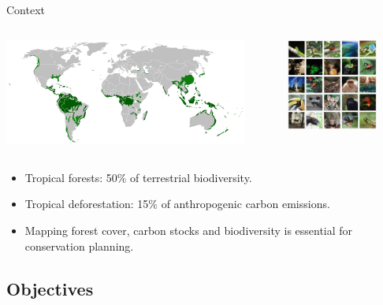 \documentclass[10pt,table,dvipsnames,compress]{beamer}
\begin{document}
\begin{frame}[label={sec:org7dbb06c}]{Context}
\begin{columns}
\begin{column}{0.7\columnwidth}
\begin{center}
\includegraphics[width=8cm]{figs/rain_forests_map.png}
\end{center}
\end{column}

\begin{column}{0.3\columnwidth}
\begin{center}
\includegraphics[width=3cm]{figs/tropical_forest_biodiv.png}
\end{center}
\end{column}
\end{columns}


\begin{block}{}
\begin{itemize}
\item Tropical forests: 50\% of terrestrial biodiversity.
\item Tropical deforestation: 15\% of anthropogenic carbon emissions.
\item Mapping forest cover, carbon stocks and biodiversity is essential for conservation planning.
\end{itemize}
\end{block}
\end{frame}

\subsection{Objectives}
\label{sec:org2a6db27}
\end{document}
